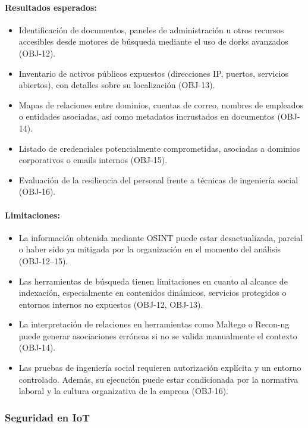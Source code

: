 \documentclass[a4paper, 10pt]{article}
\begin{document}
\paragraph{Resultados esperados:}
\begin{itemize}
    \item Identificación de documentos, paneles de administración u otros recursos accesibles desde motores de búsqueda mediante el uso de dorks avanzados (OBJ-12).
    \item Inventario de activos públicos expuestos (direcciones IP, puertos, servicios abiertos), con detalles sobre su localización (OBJ-13).
    \item Mapas de relaciones entre dominios, cuentas de correo, nombres de empleados o entidades asociadas, así como metadatos incrustados en documentos (OBJ-14).
    \item Listado de credenciales potencialmente comprometidas, asociadas a dominios corporativos o emails internos (OBJ-15).
    \item Evaluación de la resiliencia del personal frente a técnicas de ingeniería social (OBJ-16).
\end{itemize}

\paragraph{Limitaciones:}
\begin{itemize}
    \item La información obtenida mediante OSINT puede estar desactualizada, parcial o haber sido ya mitigada por la organización en el momento del análisis (OBJ-12–15).
    \item Las herramientas de búsqueda tienen limitaciones en cuanto al alcance de indexación, especialmente en contenidos dinámicos, servicios protegidos o entornos internos no expuestos (OBJ-12, OBJ-13).
    \item La interpretación de relaciones en herramientas como Maltego o Recon-ng puede generar asociaciones erróneas si no se valida manualmente el contexto (OBJ-14).
    \item Las pruebas de ingeniería social requieren autorización explícita y un entorno controlado. Además, su ejecución puede estar condicionada por la normativa laboral y la cultura organizativa de la empresa (OBJ-16).
\end{itemize}

\subsubsection{Seguridad en IoT}
\end{document}
